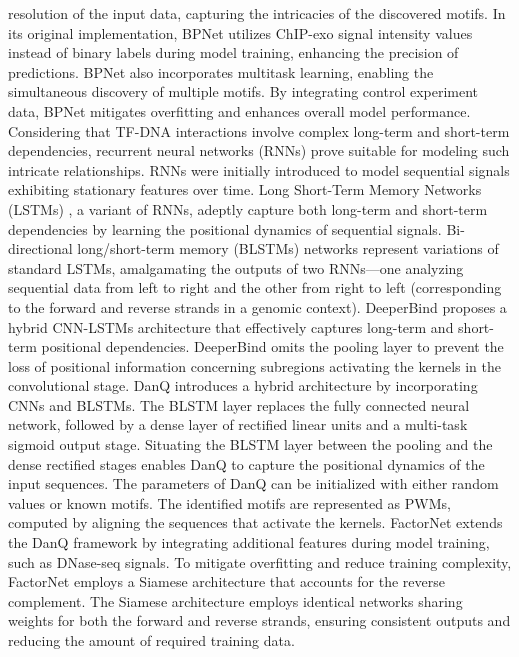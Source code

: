 \documentclass[a4paper, titlepage, openright]{book}
\begin{document}
resolution of the input data, capturing the intricacies of the discovered motifs. In its original implementation, BPNet utilizes ChIP-exo signal intensity values instead of binary labels during model training, enhancing the precision of predictions. BPNet also incorporates multitask learning, enabling the simultaneous discovery of multiple motifs. By integrating control experiment data, BPNet mitigates overfitting and enhances overall model performance. Considering that TF-DNA interactions involve complex long-term and short-term dependencies, recurrent neural networks (RNNs) prove suitable for modeling such intricate relationships. RNNs were initially introduced to model sequential signals exhibiting stationary features over time. Long Short-Term Memory Networks (LSTMs) \citep{hochreiter1997long}, a variant of RNNs, adeptly capture both long-term and short-term dependencies by learning the positional dynamics of sequential signals. Bi-directional long/short-term memory (BLSTMs) networks represent variations of standard LSTMs, amalgamating the outputs of two RNNs—one analyzing sequential data from left to right and the other from right to left (corresponding to the forward and reverse strands in a genomic context). DeeperBind \citep{hassanzadeh2016deeperbind} proposes a hybrid CNN-LSTMs architecture that effectively captures long-term and short-term positional dependencies. DeeperBind omits the pooling layer to prevent the loss of positional information concerning subregions activating the kernels in the convolutional stage. DanQ \citep{quang2016danq} introduces a hybrid architecture by incorporating CNNs and BLSTMs. The BLSTM layer replaces the fully connected neural network, followed by a dense layer of rectified linear units and a multi-task sigmoid output stage. Situating the BLSTM layer between the pooling and the dense rectified stages enables DanQ to capture the positional dynamics of the input sequences. The parameters of DanQ can be initialized with either random values or known motifs. The identified motifs are represented as PWMs, computed by aligning the sequences that activate the kernels. FactorNet \citep{quang2019factornet} extends the DanQ framework by integrating additional features during model training, such as DNase-seq signals. To mitigate overfitting and reduce training complexity, FactorNet employs a Siamese architecture that accounts for the reverse complement. The Siamese architecture employs identical networks sharing weights for both the forward and reverse strands, ensuring consistent outputs and reducing the amount of required training data.
\end{document}

